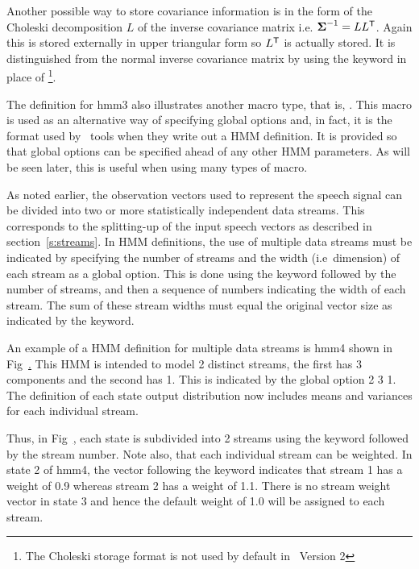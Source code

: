 Another possible way to store covariance information is in the form
of the Choleski decomposition $L$ of the 
inverse covariance matrix
i.e. ${\mbox{\boldmath $\Sigma$}}^{-1} = LL^{\scriptstyle\sf T}$.
Again this is stored externally in upper triangular form so $L^{\scriptstyle\sf T}$ is
actually stored.  It is distinguished from the normal inverse covariance
matrix by using the keyword  
in place of \footnote{
The Choleski storage format is not used by default in \HTK\ Version 2}.  


The definition for \textsf{hmm3} also illustrates another
macro type, that is, .  This macro is used as an alternative
way of specifying global options and, in fact, it is the format used
by \HTK\ tools when they write out a HMM definition.  It is provided so that global
options can be specified ahead of any other HMM parameters.  As will
be seen later, this is useful when using many types of macro.

As noted earlier, the observation vectors used to represent
the speech signal can be divided into two or more statistically
independent data streams.  This corresponds to the splitting-up
of the input speech vectors as described in section~\ref{s:streams}.
In HMM definitions, the use of multiple data
streams must be indicated by specifying the number of streams and
the width (i.e\ dimension) of each stream as a global
option.  This is done using the keyword 
 followed
by the number of streams, and then a sequence of numbers indicating
the width of each stream.  The sum of these
stream widths must equal the original vector size as indicated
by the   keyword. 

An example of a HMM definition for multiple data 
streams
is \textsf{hmm4} shown in 
Fig~\href{f:hmm4def}.  This HMM is intended to model 2 distinct
streams, the first has 3 components and the second has 1.
This is indicated by the global option  2 3 1.
The definition of each state output distribution now
includes means and variances for each individual stream.

Thus, in Fig~\href{f:hmm4def}, each state is subdivided into
2 streams using the  keyword followed by the stream
number.  Note also, that each individual stream can be weighted.
In state 2 of \textsf{hmm4}, the vector following the
 keyword indicates that
stream 1 has a weight of 0.9 whereas
stream 2 has a weight of 1.1.  There is no stream weight
 vector
in state 3 and hence the default weight of 1.0 will be
assigned to each stream.

